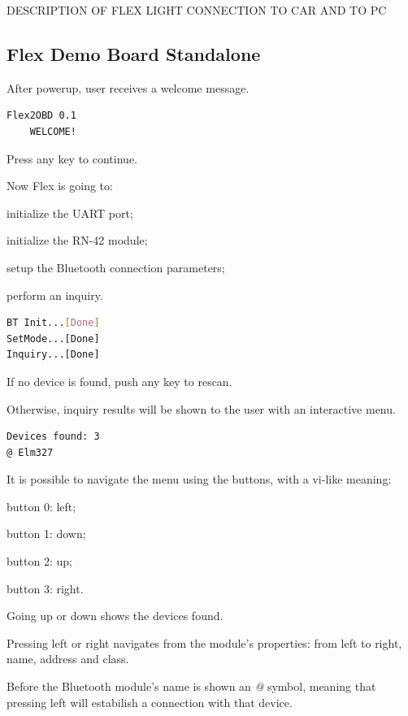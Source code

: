 \documentclass[twoside]{article}
\begin{document}
\begin{multicols}{2}
DESCRIPTION OF FLEX LIGHT CONNECTION TO CAR AND TO PC

\subsection{Flex Demo Board Standalone}

After powerup, user receives a welcome message.

\begin{lstlisting}[language=bash]
  Flex2OBD 0.1
    WELCOME!
\end{lstlisting}

Press any key to continue.

Now Flex is going to:
\begin{compactitem}
  \item initialize the UART port;
  \item initialize the RN-42 module;
  \item setup the Bluetooth connection parameters;
  \item perform an inquiry.
\end{compactitem}

\begin{lstlisting}[language=bash]
BT Init...[Done]
SetMode...[Done]
Inquiry...[Done]
\end{lstlisting}

If no device is found, push any key to rescan.

Otherwise, inquiry results will be shown to the user with an interactive menu. 

\begin{lstlisting}[language=bash]
Devices found: 3
@ Elm327
\end{lstlisting}

It is possible to navigate the menu using the buttons, with a vi-like meaning:
\begin{compactitem}
  \item button 0: left;
  \item button 1: down;
  \item button 2: up;
  \item button 3: right.
\end{compactitem}

Going up or down shows the devices found.

Pressing left or right navigates from the module's properties: from left to right, name, address and class.

Before the Bluetooth module's name is shown an \emph{@} symbol, meaning that pressing left will estabilish a connection with that device.


\end{multicols}
\end{document}
